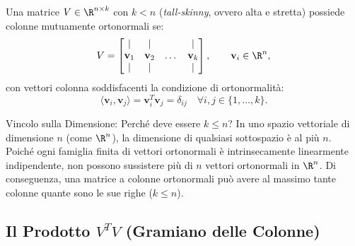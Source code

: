 \begin{definition}
Una matrice $V \in \R^{n \times k}$ con $k < n$ (\textit{tall-skinny}, ovvero alta e stretta) possiede colonne mutuamente ortonormali se:
\begin{equation}
    V = \begin{bmatrix} \mid & \mid & & \mid \\ \mathbf{v}_1 & \mathbf{v}_2 & \dots & \mathbf{v}_k \\ \mid & \mid & & \mid \end{bmatrix}, \qquad \mathbf{v}_i \in \R^n,
\end{equation}
con vettori colonna soddisfacenti la condizione di ortonormalit\`a:
\begin{equation}
    \langle \mathbf{v}_i, \mathbf{v}_j \rangle = \mathbf{v}_i^T \mathbf{v}_j = \delta_{ij} \quad \forall i, j \in \{1, \dots, k\}.
\end{equation}
\end{definition}

\begin{alertblock}{Vincolo sulla Dimensione: Perch\'e deve essere $k \le n$?}
In uno spazio vettoriale di dimensione $n$ (come $\R^n$), la dimensione di qualsiasi sottospazio \`e al pi\`u $n$. Poich\'e ogni famiglia finita di vettori ortonormali \`e intrinsecamente linearmente indipendente, non possono sussistere pi\`u di $n$ vettori ortonormali in $\R^n$. Di conseguenza, una matrice a colonne ortonormali pu\`o avere al massimo tante colonne quante sono le sue righe ($k \le n$).
\end{alertblock}

\subsection{Il Prodotto \texorpdfstring{$V^T V$}{V\textasciicircum T V} (Gramiano delle Colonne)}

